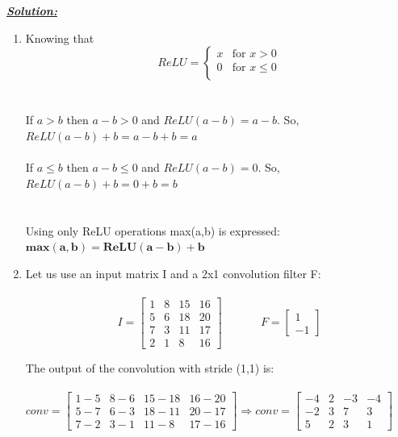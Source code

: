 \documentclass{article}
\begin{document}
\noindent \underline{\textbf{\textit{Solution:}}}
\begin{enumerate} [label=\Alph*]
    
        \item  Knowing that
            \[ ReLU = \begin{cases}
                x & \text{for } x > 0 \\
                0 & \text{for } x \leq 0 \\
            \end{cases} \] \\ \\If $a > b$ then $a - b > 0$ and $ReLU(a-b) = a - b$. So, $ReLU(a-b) + b = a - b + b = a$ \\ \\
          If $a \leq b$ then $a - b \leq 0$ and $ReLU(a-b) = 0$. So, $ReLU(a-b) + b = 0 + b = b$ \\ \\ \\
          Using only ReLU operations max(a,b) is expressed: $\bm{max(a,b) = ReLU(a-b) +b}$ \\

          \item Let us use an input matrix I and a 2x1 convolution filter F: \\ \\
          \[
            I = \begin{bmatrix}
                1 & 8 & 15 & 16 \\
                5 & 6 & 18 & 20 \\
                7 & 3 & 11 & 17 \\
                2 & 1 & 8 & 16
            \end{bmatrix}
            \quad
            \hspace{1cm}
            F = \begin{bmatrix}
                1 \\ -1
            \end{bmatrix} 
            \]
          
          \vspace{0.8cm}  
          The output of the convolution with stride (1,1) is:  \\\\
          $ conv = 
          \begin{bmatrix}
            1-5 & 8-6 & 15-18 & 16-20 \\
            5-7 & 6-3 & 18-11 & 20-17 \\
            7-2 & 3-1 & 11-8 & 17-16
          \end{bmatrix} \Rightarrow conv=
          \begin{bmatrix}
              -4 & 2 & -3 & -4 \\
              -2 & 3 & 7 & 3 \\
              5 & 2 & 3 & 1
          \end{bmatrix}$
          \vspace{1cm} 


\end{enumerate}
\end{document}
